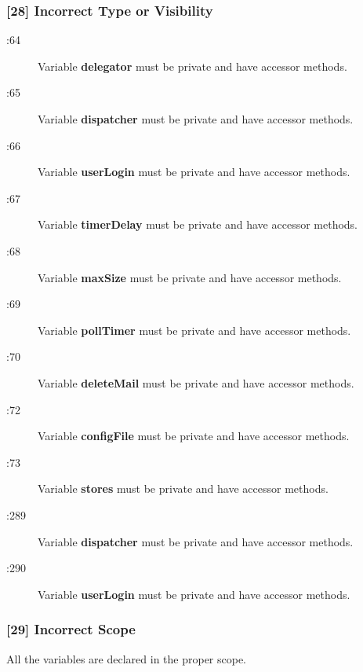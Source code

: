 \subsubsection{[28] Incorrect Type or Visibility}
\begin{description}
	\item[:64] Variable \textbf{delegator} must be private and have accessor methods.
	\item[:65] Variable \textbf{dispatcher} must be private and have accessor methods.
	\item[:66] Variable \textbf{userLogin} must be private and have accessor methods.
	\item[:67] Variable \textbf{timerDelay} must be private and have accessor methods.
	\item[:68] Variable \textbf{maxSize} must be private and have accessor methods.
	\item[:69] Variable \textbf{pollTimer} must be private and have accessor methods.
	\item[:70] Variable \textbf{deleteMail} must be private and have accessor methods.
	\item[:72] Variable \textbf{configFile} must be private and have accessor methods.
	\item[:73] Variable \textbf{stores} must be private and have accessor methods.
	\item[:289] Variable \textbf{dispatcher} must be private and have accessor methods.
	\item[:290] Variable \textbf{userLogin} must be private and have accessor methods.
\end{description}

\subsubsection{[29] Incorrect Scope}
All the variables are declared in the proper scope.

